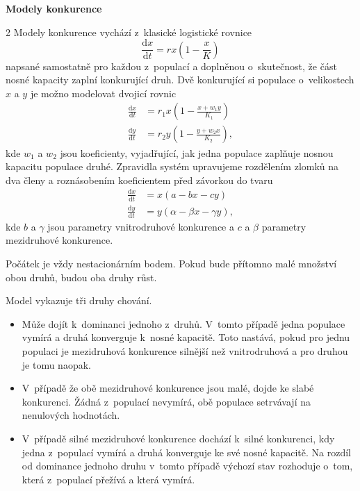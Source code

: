 \documentclass{article}
\begin{document}
\begin{center}
  \Large \bfseries
Modely konkurence
\end{center}
\pagestyle{empty}

\begin{multicols}2
Modely konkurence vychází z klasické logistické rovnice
$$    \frac{\mathrm dx}{\mathrm dt} = rx\left(1-\frac{x}{K}\right) $$
napsané samostatně pro každou z populací a doplněnou o skutečnost, že část nosné kapacity zaplní konkurující druh. 
Dvě konkurující si populace o velikostech $x$ a $y$ je možno modelovat dvojicí
rovnic
\begin{equation*}
  \begin{aligned}
    \frac{\mathrm dx}{\mathrm dt} &= r_1x\left(1-\frac{x+w_1y}{K_1}\right) \\
    \frac{\mathrm dy}{\mathrm dt} &= r_2y\left(1-\frac{y+w_2x}{K_2}\right), 
  \end{aligned}
\end{equation*}
kde $w_1$ a $w_2$ jsou koeficienty, vyjadřující, jak jedna populace zaplňuje nosnou kapacitu populace druhé. 
Zpravidla systém upravujeme rozdělením zlomků na dva členy a roznásobením koeficientem před závorkou do tvaru
\begin{equation*}
  \begin{aligned}
    \frac{\mathrm dx}{\mathrm dt} &= x(a-bx-cy) \\
    \frac{\mathrm dy}{\mathrm dt} &= y(\alpha-\beta x - \gamma y), 
  \end{aligned}
\end{equation*}
kde $b$ a $\gamma$ jsou parametry vnitrodruhové konkurence a $c$ a $\beta$ parametry mezidruhové konkurence.

Počátek je vždy nestacionárním bodem. Pokud bude přítomno malé
množství obou druhů, budou oba druhy růst.

Model vykazuje tři druhy chování.
\begin{itemize} pt
\item Může dojít k dominanci jednoho z druhů. V tomto případě jedna
  populace vymírá a druhá konverguje k nosné kapacitě. Toto nastává,
  pokud pro jednu populaci je mezidruhová konkurence silnější než
  vnitrodruhová a pro druhou je tomu naopak.
\item V případě že obě mezidruhové konkurence jsou malé, dojde ke
  slabé konkurenci. Žádná z populací nevymírá, obě populace setrvávají
  na nenulových hodnotách.
\item V případě silné mezidruhové konkurence dochází k silné
  konkurenci, kdy jedna z populací vymírá a druhá konverguje ke své
  nosné kapacitě. Na rozdíl od dominance jednoho druhu v tomto případě
  výchozí stav rozhoduje o tom, která z populací přežívá a která
  vymírá.
\end{itemize}


\end{multicols}
\end{document}
